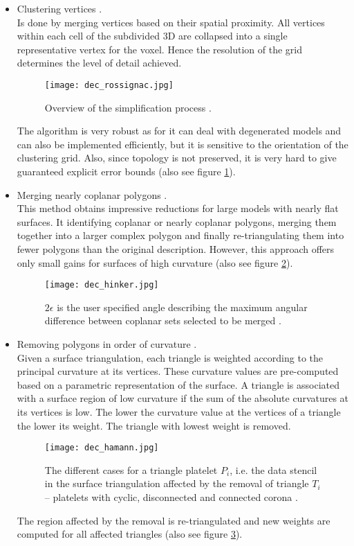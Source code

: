 \begin{itemize}
    \item Clustering vertices \citep[cf.][]{Rossignac1993}.\\
Is done by merging vertices based on their spatial proximity. All vertices within each cell of the subdivided 3D are collapsed into a single representative vertex for the voxel. Hence the resolution of the grid determines the level of detail achieved.
\begin{figure}[ht]
\centering
\texttt{[image: dec\_rossignac.jpg]}
\caption{Overview of the simplification process \citep[][p.458]{Rossignac1993}.}
\label{fig:dec_rossignac}
\end{figure}
The algorithm is very robust as for it can deal with degenerated models and can also be implemented efficiently, but it is sensitive to the orientation of the clustering grid. Also, since topology is not preserved, it is very hard to give guaranteed explicit error bounds (also see figure \ref{fig:dec_rossignac}).

    \item Merging nearly coplanar polygons \citep[cf.][]{Hinker1993}.\\
This method obtains impressive reductions for large models with nearly flat surfaces. It identifying coplanar or nearly coplanar polygons, merging them together into a larger complex polygon and finally re-triangulating them into fewer polygons than the original description. However, this approach offers only small gains
for surfaces of high curvature (also see figure \ref{fig:dec_hinker}).
\begin{figure}[ht]
\centering
\texttt{[image: dec\_hinker.jpg]}
\caption{
$2\epsilon$ is the user specified angle describing the maximum angular difference between coplanar sets selected to be merged \citep[][p.192]{Hinker1993}.}
\label{fig:dec_hinker}
\end{figure}

    \item Removing polygons in order of curvature \citep[cf.][]{Hamann1994}.\\
Given a surface triangulation, each triangle is weighted according to the principal curvature at its vertices.
These curvature values are pre-computed based on a parametric representation of the surface.
A triangle is associated with a surface region of low curvature if the sum of the absolute curvatures at its vertices is low.
The lower the curvature value at the vertices of a triangle the lower its weight.
The triangle with lowest weight is removed.
\begin{figure}[ht]
\centering
\texttt{[image: dec\_hamann.jpg]}
\caption{The different cases for a triangle platelet $P_{i}$, i.e. the data stencil in the surface triangulation affected by the removal of triangle $T_{i}$ --  platelets with cyclic, disconnected and connected corona \citep[][p.200]{Hamann1994}.}
\label{fig:dec_hamann}
\end{figure}
The region affected by the removal is re-triangulated and new weights are computed for all affected triangles (also see figure \ref{fig:dec_hamann}).


\end{itemize}
